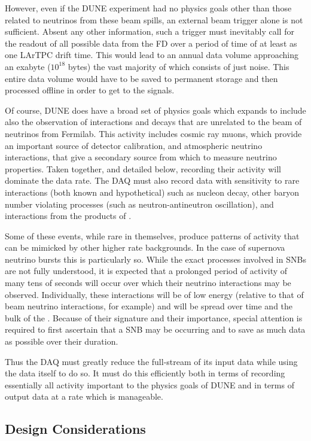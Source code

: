 However, even if the DUNE experiment had no physics goals other than
those related to neutrinos from these beam spills, an external beam
trigger alone is not sufficient. 
Absent any other information, such a trigger must inevitably call for
the readout of all possible data from the FD over a period of time of
at least as one LArTPC drift time. 
This would lead to an annual data volume approaching an exabyte
($10^{18}$ bytes) the vast majority of which consists of just noise. 
This entire data volume would have to be saved to permanent storage
and then processed offline in order to get to the signals.

Of course, DUNE does have a broad set of physics goals which expands
to include also the observation of interactions and decays that are
unrelated to the beam of neutrinos from Fermilab. 
This activity includes cosmic ray muons, which provide an important
source of detector calibration, and atmospheric neutrino interactions,
that give a secondary source from which to measure neutrino
properties. 
Taken together, and detailed below, recording their activity will
dominate the data rate.
The DAQ must also record data with sensitivity to rare interactions
(both known and hypothetical) such as nucleon decay, other baryon
number violating processes (such as neutron-antineutron oscillation),
and interactions from the products of . 

Some of these events, while rare in themselves, produce patterns of
activity that can be mimicked by other higher rate backgrounds.
In the case of supernova neutrino bursts this is particularly so. 
While the exact processes involved in SNBs are not fully understood,
it is expected that a prolonged period of activity of many tens of
seconds will occur over which their neutrino interactions may be
observed. 
Individually, these interactions will be of low energy (relative to
that of beam neutrino interactions, for example) and will be spread
over time and the bulk of the . 
Because of their signature and their importance, special attention is
required to first ascertain that a SNB may be occurring and to save as
much data as possible over their duration.

Thus the DAQ must greatly reduce the full-stream of its input data
while using the data itself to do so. 
It must do this efficiently both in terms of recording essentially all
activity important to the physics goals of DUNE and in terms of
output data at a rate which is manageable.  


\subsection{Design Considerations}
\label{sec:fd-daq-des-consid}

